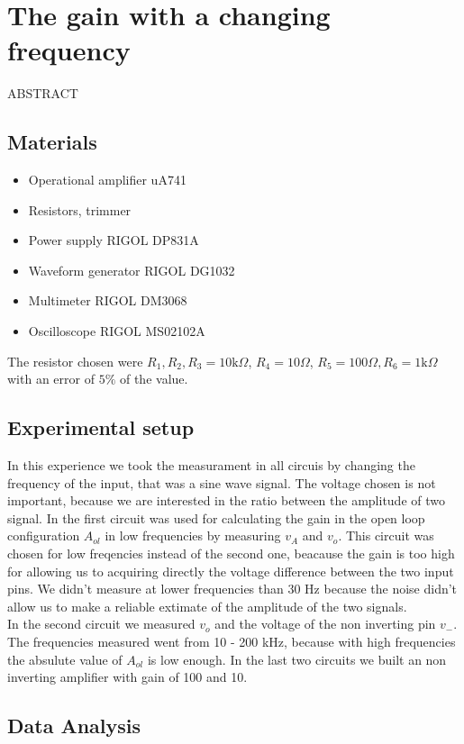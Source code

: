 \chapter{The gain with a changing frequency}
ABSTRACT

\section{Materials}
\begin{itemize}
\item Operational amplifier uA741
\item Resistors, trimmer
\item Power supply RIGOL DP831A
\item Waveform generator RIGOL DG1032
\item Multimeter RIGOL DM3068
\item Oscilloscope RIGOL MS02102A
\end{itemize}
The resistor chosen were $R_1, R_2, R_3 = 10\text{k} \Omega$, $R_4 = 10 \Omega$, $R_5 = 100 \Omega, R_6 = 1\text{k}\Omega$ with an error of $5\%$ of the value.
\section{Experimental setup}

In this experience we took the measurament in all circuis by changing the frequency of the input, that was a  sine wave signal. The voltage chosen is not important, because we are interested in the ratio between the amplitude of two signal.
In the first circuit was used for calculating the gain in the open loop configuration $A_{ol}$ in low frequencies by measuring $v_A$ and $v_{o}$. This circuit was chosen for low freqencies instead of the second one, beacause the gain is too high for allowing us to acquiring directly the voltage difference between the two input pins. 
We didn't measure at lower frequencies than 30 Hz because the noise didn't allow us to make a reliable extimate of the amplitude of the two signals.\\
In the second circuit we measured $v_{o}$ and the voltage of the non inverting pin $v_-$. The frequencies measured went from 10 - 200 kHz, because with high frequencies the absulute value of $A_{ol}$ is low enough.
In the last two circuits we built an non inverting amplifier with gain of 100 and 10.

\section{Data Analysis}

